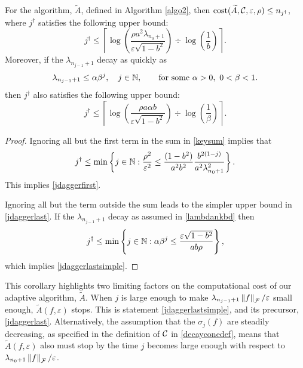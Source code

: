 \documentclass[graybox,footinfo]{svmult}
\newcommand{\DHJRnorm}[2][{}]{\ensuremath{\left \lVert #2 \right \rVert}_{#1}}
\begin{document}
\begin{corollary} For the algorithm, $\widetilde{A}$, defined in Algorithm \ref{algo2}, then $\textup{cost}(\widetilde{A},{\mathcal{C}},\varepsilon,\rho) \le n_{j^\dagger}$, where $j^\dagger$ satisfies the following upper bound:
\begin{equation} \label{jdaggerfirst}
j^\dagger \le \left \lceil \log\left(\frac{\rho a^2\lambda_{n_{0}+1} }{\varepsilon \sqrt{1 - b^2}}\right) \div \log\left(\frac{1}{b}\right) \right \rceil.
\end{equation}
Moreover, if the $\lambda_{n_{j-1}+1}$ decay as quickly as
\begin{equation}
\label{lambdankbd}
\lambda_{n_{j-1}+1} \le \alpha \beta^j,  \quad j \in \bbN,  \qquad \text{for some } \alpha > 0, \ 0 < \beta < 1.
\end{equation}
then $j^\dagger$ also satisfies the following upper bound:
\begin{equation}
\label{jdaggerlastsimple}
j^\dagger \le
\left \lceil \log\left(\frac{\rho a\alpha b }{\varepsilon \sqrt{1 - b^2}}\right) \div \log\left(\frac{1}{\beta}\right) \right \rceil.
\end{equation}
\end{corollary}

\begin{proof}
Ignoring all but the first term in the sum in \eqref{keysum} implies that 
\begin{equation} \label{jsumupperbd}
j^\dagger \le \min \left \{j \in \bbN : \frac{\rho^2}{\varepsilon^2} \le \frac{(1 - b^2)}{a^2b^2} \frac{b^{2(1-j)}}{a^2\lambda_{n_{0}+1}^2}    \right\}.
\end{equation}
This implies \eqref{jdaggerfirst}.

Ignoring all but the term outside the sum leads to the simpler upper bound in \eqref{jdaggerlast}.  If the $\lambda_{n_{j-1}+1}$ decay as assumed in \eqref{lambdankbd} then
\[
j^\dagger \le \min \left \{j \in {\mathbb{N}} :  \alpha \beta^j \le \frac{\varepsilon\sqrt{1 - b^2}}{ab \rho} \right\},
\]
which implies \eqref{jdaggerlastsimple}.
\end{proof}

This corollary highlights two limiting factors on the computational cost of our adaptive algorithm, $\widetilde{A}$. When $j$ is large enough to make $\lambda_{n_{j-1}+1}\DHJRnorm[\calF]{f}/\varepsilon$ small enough, $\widetilde{A}(f,\varepsilon)$ stops.  This is statement \eqref{jdaggerlastsimple}, and its precursor, \eqref{jdaggerlast}.  Alternatively, the assumption that the $\sigma_j(f)$ are steadily decreasing, as specified in the definition of ${\mathcal{C}}$ in \eqref{decayconedef}, means that $\widetilde{A}(f,\varepsilon)$ also must stop by the time $j$ becomes large enough with respect to $\lambda_{n_0+1}\DHJRnorm[\calF]{f}/\varepsilon$.
\end{document}
